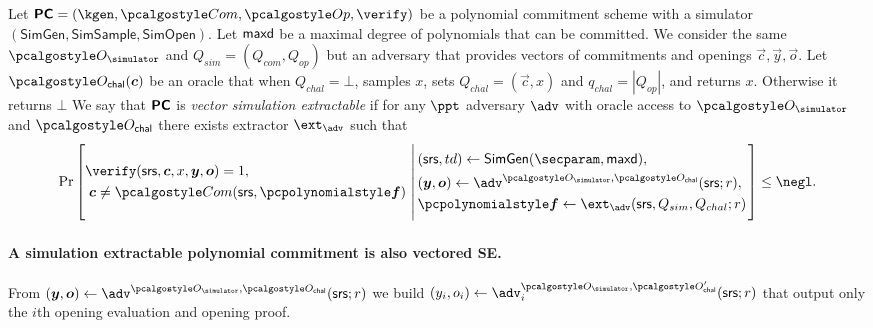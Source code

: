 \documentclass[runningheads,11pt]{llncs}
\begin{document}
\begin{definition}
  \label{def:sepcom}
  Let $\PCOM = (\kgen, \com, \open, \verify)$ be a polynomial commitment
  scheme with a simulator $(\mathsf{SimGen}, \mathsf{SimSample}, \mathsf{SimOpen})$. Let $\mathsf{maxd}$ be a maximal degree of polynomials that can be
  committed.
  We consider the same $\oracles$ and $Q_{sim}= (Q_{com},Q_{op})$ but an adversary that provides vectors of commitments and openings $\vec{c}, \vec{y}, \vec{o}$.
   Let $\oraclec(\vec{c})$ be an oracle that when $Q_{chal}= \bot$, samples $x$, sets $Q_{chal}=(\vec{c},x)$ and $q_{{chal}}= |Q_{{op}}|$, and returns $x$. Otherwise it returns $\bot$
  We say that $\bm{\mathsf{PC}}$ is \emph{vector simulation extractable} if for any $\ppt$
  adversary $\adv$ with oracle access to $\oracles$ and $\oraclec$ there exists extractor
  $\ext_{\adv}$ such that
\[
  \Pr \left[
    \begin{aligned}
      & \verify(\srs, \vec{c}, x, \vec{y}, \vec{o}) = 1, \\
      & \;\vec{c} \neq \com(\srs, \vec{\p{f}})\\
    \end{aligned}
    \,\left|\,
      \vphantom{
        \begin{aligned}
          & \\
          & \\
          & \\
          &
        \end{aligned}
        }
    \begin{aligned}
      & (\srs, td) \gets \mathsf{SimGen}(\secparam, \maxdeg),\\
      & (\vec{y}, \vec{o}) \gets \adv^{\oracles,\oraclec}(\srs; r), \\
      & \vec{\p{f}} \gets \ext_\adv(\srs, Q_{sim}, Q_{chal}; r)
    \end{aligned}
  \right.\right]
  \leq \negl.
\]
\end{definition}

\paragraph{A simulation extractable polynomial commitment is also vectored SE.}
From $(\vec{y}, \vec{o}) \gets \adv^{\oracles,\oraclec}(\srs; r)$ we build $(y_{i}, o_{i}) \gets \adv_{i}^{\oracles,\oraclec'}(\srs; r)$ that output only the $i$th opening evaluation and opening proof.
\end{document}
